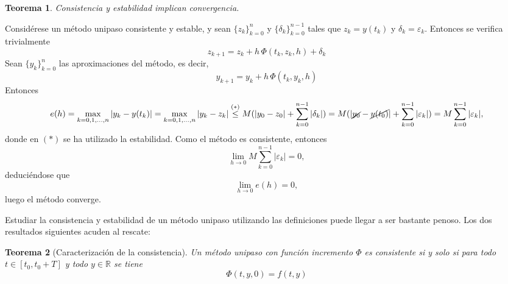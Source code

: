 \documentclass[11pt]{report}
\makeatletter
\renewenvironment{proof}[1][\proofname]{\par
  \pushQED{\qed}%
  \normalfont \topsep\z@skip %
  \trivlist
  \item[\hskip\labelsep
        \itshape
    #1\@addpunct{.}]\ignorespaces
}{%
  \popQED\endtrivlist\@endpefalse
}
\theoremstyle{mytheorem}
\newtheorem{theorem}{Teorema}
\theoremstyle{mydefinition}
\theoremstyle{myexample}
\let\oldproofname=\proofname
\renewcommand{\proofname}{\rm\bf{\oldproofname}}}
\newenvironment{ctheorem} %
  {\begin{mdframed}[
        linewidth=3pt,
        linecolor=c2,
        bottomline=false,
        topline=false,
        rightline=false,
        innerrightmargin=0pt,
        innertopmargin=0pt,
        innerbottommargin=0pt,
        innerleftmargin=1em, %
        skipabove=\baselineskip]
    \begin{theorem}}
  {\end{theorem}\end{mdframed}}
\newcommand{\R}{\mathbb R}
\makeatother
\begin{document}
\begin{ctheorem}
\label{teo2.5}
Consistencia y estabilidad implican convergencia.
\end{ctheorem}

\begin{proof}
Considérese un método unipaso consistente y estable, y sean $\{z_k\}_{k=0}^n$ y $\{\delta_k\}_{k=0}^{n-1}$ tales que $z_k = y(t_k)$ y $\delta_k = \varepsilon_k$. Entonces se verifica trivialmente
\[z_{k+1} = z_k+h \, \Phi(t_k,z_k,h)+\delta_k\]
Sean $\{y_k\}_{k=0}^n$ las aproximaciones del método, es decir,
\[y_{k+1} = y_k+h \, \Phi(t_k,y_k,h)\]
Entonces
\[e(h) = \max_{k=0,1,\mathellipsis,n}|y_k-y(t_k)| = \max_{k=0,1,\mathellipsis,n}|y_k-z_k| \overset{(\ast)}{\leq} M(|y_0-z_0|+\sum_{k=0}^{n-1}|\delta_k|) = M(|\cancel{y_0}-\cancel{y(t_0)}|+\sum_{k=0}^{n-1}|\varepsilon_k|) =  M\sum_{k=0}^{n-1} |\varepsilon_k|,\]
donde en $(\ast)$ se ha utilizado la estabilidad. Como el método es consistente, entonces
\[\lim_{h \to 0} M\sum_{k=0}^{n-1}|\varepsilon_k| = 0,\]
deduciéndose que
\[\lim_{h\to 0} e(h) = 0,\]
luego el método converge.
\end{proof}

Estudiar la consistencia y estabilidad de un método unipaso utilizando las definiciones puede llegar a ser bastante penoso. Los dos resultados siguientes acuden al rescate:

\begin{ctheorem}[Caracterización de la consistencia]
\label{teo2.6}
Un método unipaso con función incremento $\Phi$ es consistente si y solo si para todo $t \in [t_0,t_0+T]$ y todo $y \in \R$ se tiene
\[\Phi(t,y,0) = f(t,y)\]
\end{ctheorem}
\end{document}
